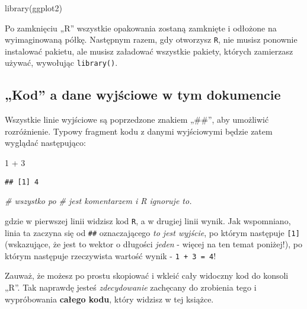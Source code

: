\documentclass[
]{article}
\newenvironment{Shaded}{\begin{snugshade}}{\end{snugshade}}
\newcommand{\CommentTok}[1]{\textcolor[rgb]{0.56,0.35,0.01}{\textit{#1}}}
\newcommand{\DecValTok}[1]{\textcolor[rgb]{0.00,0.00,0.81}{#1}}
\newcommand{\FunctionTok}[1]{\textcolor[rgb]{0.00,0.00,0.00}{#1}}
\newcommand{\NormalTok}[1]{#1}
\newcommand{\SpecialCharTok}[1]{\textcolor[rgb]{0.00,0.00,0.00}{#1}}
\begin{document}
\begin{Shaded}
\begin{Highlighting}[]
\FunctionTok{library}\NormalTok{(ggplot2)}
\end{Highlighting}
\end{Shaded}

Po zamknięciu „R'' wszystkie opakowania zostaną zamknięte i odłożone na
wyimaginowaną półkę. Następnym razem, gdy otworzysz \texttt{R}, nie
musisz ponownie instalować pakietu, ale musisz załadować wszystkie
pakiety, których zamierzasz używać, wywołując \texttt{library()}.

\hypertarget{code-output}{%
\subsection{„Kod'' a dane wyjściowe w tym
dokumencie}\label{code-output}}

Wszystkie linie wyjściowe są poprzedzone znakiem „\#\#'', aby umożliwić
rozróżnienie. Typowy fragment kodu z danymi wyjściowymi będzie zatem
wyglądać następująco:

\begin{Shaded}
\begin{Highlighting}[]
\DecValTok{1} \SpecialCharTok{+} \DecValTok{3}
\end{Highlighting}
\end{Shaded}

\begin{verbatim}
## [1] 4
\end{verbatim}

\begin{Shaded}
\begin{Highlighting}[]
\CommentTok{\# wszystko po \# jest komentarzem i R ignoruje to.}
\end{Highlighting}
\end{Shaded}

gdzie w pierwszej linii widzisz kod \texttt{R}, a w drugiej linii wynik.
Jak wspomniano, linia ta zaczyna się od \texttt{\#\#} oznaczającego
\emph{to jest wyjście}, po którym następuje \texttt{{[}1{]}}
(wskazujące, że jest to wektor o długości \emph{jeden} - więcej na ten
temat poniżej!), po którym następuje rzeczywista wartość wynik -
\texttt{1\ +\ 3\ =\ 4}!

Zauważ, że możesz po prostu skopiować i wkleić cały widoczny kod do
konsoli „R''. Tak naprawdę jesteś \emph{zdecydowanie} zachęcany do
zrobienia tego i wypróbowania \textbf{całego kodu}, który widzisz w tej
książce.
\end{document}

